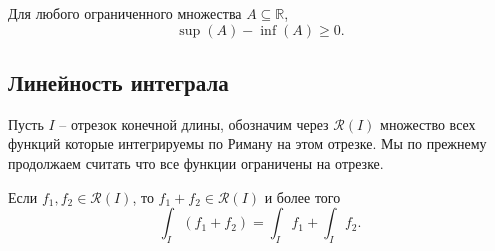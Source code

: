 \begin{corollary}
Для любого ограниченного множества $A \subseteq \mathbb{R}$,
    \[
     \sup(A) - \inf(A) \ge 0.
    \]
    
\end{corollary}

\subsection{Линейность интеграла}

Пусть $I$ -- отрезок конечной длины, обозначим через $\mathscr{R}(I)$ множество всех функций которые интегрируемы по Риману на этом отрезке. Мы по прежнему продолжаем считать что все функции ограничены на отрезке.

\begin{theorem}\label{int(f+g)=int(f)+int(g)}
    Если $f_1,f_2 \in \mathscr{R}(I)$, то $f_1 +f_2 \in \mathscr{R}(I)$ и более того
    \[
     \int_I(f_1 + f_2) = \int_I f_1 + \int_I f_2.
    \]
\end{theorem}
